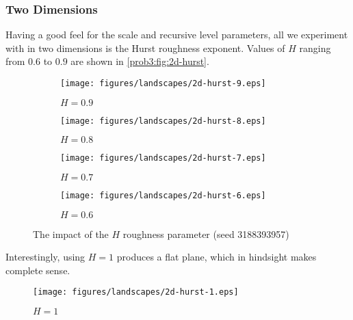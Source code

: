 \subsubsection{Two Dimensions}
Having a good feel for the scale and recursive level parameters, all we experiment with in two dimensions is the Hurst roughness exponent.
Values of $H$ ranging from $0.6$ to $0.9$ are shown in \autoref{prob3:fig:2d-hurst}.

\begin{figure}[H]
    \centering
    \begin{subfigure}[t]{0.55\textwidth}
        \centering
        \texttt{[image: figures/landscapes/2d-hurst-9.eps]}
        \caption{$H = 0.9$}
    \end{subfigure}%
    \begin{subfigure}[t]{0.55\textwidth}
        \centering
        \texttt{[image: figures/landscapes/2d-hurst-8.eps]}
        \caption{$H = 0.8$}
    \end{subfigure}%

    \begin{subfigure}[b]{0.55\textwidth}
        \centering
        \texttt{[image: figures/landscapes/2d-hurst-7.eps]}
        \caption{$H = 0.7$}
    \end{subfigure}%
    \begin{subfigure}[b]{0.55\textwidth}
        \centering
        \texttt{[image: figures/landscapes/2d-hurst-6.eps]}
        \caption{$H = 0.6$}
    \end{subfigure}%
    \caption{The impact of the $H$ roughness parameter (seed 3188393957)}\label{prob3:fig:2d-hurst}
\end{figure}

Interestingly, using $H=1$ produces a flat plane, which in hindsight makes complete sense.

\begin{figure}[H]
    \centering
    \texttt{[image: figures/landscapes/2d-hurst-1.eps]}
    \caption{$H = 1$}\label{prob3:fig:2d-hurst-1}
\end{figure}
